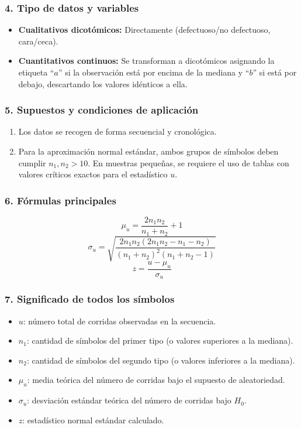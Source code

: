 \documentclass[11pt,a4paper]{article}
\begin{document}
\subsubsection{4. Tipo de datos y variables}
\begin{itemize}
    \item \textbf{Cualitativos dicotómicos:} Directamente (defectuoso/no defectuoso, cara/ceca).
    \item \textbf{Cuantitativos continuos:} Se transforman a dicotómicos asignando la etiqueta ``$a$'' si la observación está por encima de la mediana y ``$b$'' si está por debajo, descartando los valores idénticos a ella.
\end{itemize}

\subsubsection{5. Supuestos y condiciones de aplicación}
\begin{enumerate}
    \item Los datos se recogen de forma secuencial y cronológica.
    \item Para la aproximación normal estándar, ambos grupos de símbolos deben cumplir $n_1, n_2 > 10$. En muestras pequeñas, se requiere el uso de tablas con valores críticos exactos para el estadístico $u$.
\end{enumerate}

\subsubsection{6. Fórmulas principales}
\begin{tcolorbox}[colback=blue!5!white,colframe=blue!60!black,title=Fórmulas de la Prueba de Corridas]
    \[ \mu_u = \frac{2 n_1 n_2}{n_1 + n_2} + 1 \]
    \[ \sigma_u = \sqrt{\frac{2 n_1 n_2 (2 n_1 n_2 - n_1 - n_2)}{(n_1 + n_2)^2 (n_1 + n_2 - 1)}} \]
    \[ z = \frac{u - \mu_u}{\sigma_u} \]
\end{tcolorbox}

\subsubsection{7. Significado de todos los símbolos}
\begin{itemize}
    \item $u$: número total de corridas observadas en la secuencia.
    \item $n_1$: cantidad de símbolos del primer tipo (o valores superiores a la mediana).
    \item $n_2$: cantidad de símbolos del segundo tipo (o valores inferiores a la mediana).
    \item $\mu_u$: media teórica del número de corridas bajo el supuesto de aleatoriedad.
    \item $\sigma_u$: desviación estándar teórica del número de corridas bajo $H_0$.
    \item $z$: estadístico normal estándar calculado.
\end{itemize}
\end{document}
